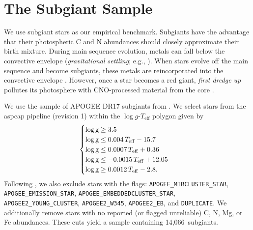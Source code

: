 \documentclass[fleqn,
usenatbib]{mnras}
\newcommand{\nsubgiants}{14,066}
\begin{document}
\section{The Subgiant Sample}\label{sec:data_selection}




We use subgiant stars as our empirical benchmark.
Subgiants have the advantage that their photospheric C and N abundances should closely approximate their birth mixture.
During main sequence evolution, metals can fall below the convective envelope (\textit{gravitational settling}; e.g., \citealt{turncotte+98}).
When stars evolve off the main sequence and become subgiants, these metals are reincorporated into the convective envelope \citep[]{gratton+00, souto19}. 
However, once a star becomes a red giant, \textit{first dredge up} pollutes its photosphere with CNO-processed material from the core \citep{iben67, KL14}. 


We use the sample of APOGEE DR17 subgiants from \citet{jack}. We select stars from the {\sc aspcap} pipeline (revision 1) within the $\log g$-$T_\text{eff}$ polygon given by
 \begin{equation}
    \begin{cases} \label{eq:subgiant_selection}
        \log \text{g} \geq 3.5 \\
        \log \text{g} \leq 0.004\,T_{\rm eff} - 15.7 \\
        \log \text{g} \leq 0.0007\,T_{\rm eff} + 0.36 \\
        \log \text{g} \leq -0.0015\,T_{\rm eff} + 12.05 \\
        \log \text{g} \geq 0.0012\,T_{\rm eff} - 2.8. \\
    \end{cases}
\end{equation}
Following \citet{jack}, we also exclude stars with the flags:
        \verb|APOGEE_MIRCLUSTER_STAR|,
        \verb|APOGEE_EMISSION_STAR|,
        \verb|APOGEE_EMBEDDEDCLUSTER_STAR|,
        \verb|APOGEE2_YOUNG_CLUSTER|,
        \verb|APOGEE2_W345|,
        \verb|APOGEE2_EB|, and
        \verb|DUPLICATE|.
We additionally remove stars with no reported (or flagged unreliable) C, N, Mg, or Fe abundances. These cuts yield a sample containing \nsubgiants\ subgiants.
\end{document}
